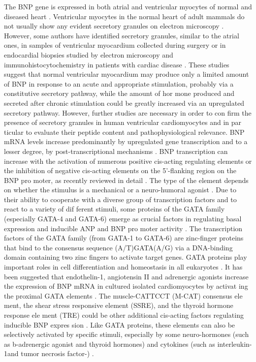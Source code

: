 \documentclass[14pt,a4paper,onecolumn]{extarticle}
\begin{document}
The BNP gene is expressed in both atrial and ventricular myocytes of normal and diseased heart \citep{12} \citep{13} \citep{14} \citep{18}. Ventricular myocytes in the normal heart of adult mammals do not usually show any evident secretory granules on electron microscopy \citep{13} \citep{14}.  However, some authors have identified secretory granules, similar to the atrial ones, in samples of ventricular myocardium collected during surgery or in endocardial biopsies studied by electron microscopy and immunohistocytochemistry in patients with cardiac disease \citep{14} \citep{25} \citep{26}. These studies suggest that normal ventricular myocardium may produce only a limited amount of BNP in response to an acute and appropriate stimulation, probably via a constitutive secretory pathway, while the amount of hor mone produced and secreted after chronic stimulation could be greatly increased via an upregulated secretory pathway. However, further studies are necessary in order to con firm the presence of secretory granules in human ventricular cardiomyocytes and in par ticular to evaluate their peptide content and pathophysiological relevance.  BNP mRNA levels increase predominantly by upregulated gene transcription and to a lesser degree, by post-transcriptional mechanisms \citep{22}. BNP transcription can increase with the activation of numerous positive cis-acting regulating elements or the inhibition of negative cis-acting elements on the 5’-flanking region on the BNP pro moter, as recently reviewed in detail \citep{18} \citep{22}. The type of the element depends on whether the stimulus is a mechanical or a neuro-humoral agonist \citep{22} \citep{23}. Due to their ability to cooperate with a diverse group of transcription factors and to react to a variety of dif ferent stimuli, some proteins of the GATA family (especially GATA-4 and GATA-6) emerge as crucial factors in regulating basal expression and inducible ANP and BNP pro moter activity \citep{18} \citep{23}. The transcription factors of the GATA family (from GATA-1 to GATA-6) are zinc-finger proteins that bind to the consensus sequence (A/T)GATA(A/G) via a DNA-binding domain containing two zinc fingers to activate target genes. GATA proteins play important roles in cell differentiation and homeostasis in all eukaryotes \citep{23}. It has been suggested that endothelin-1, angiotensin II and adrenergic agonists increase the expression of BNP mRNA in cultured isolated cardiomyocytes by activat ing the proximal GATA elements \citep{22}. The muscle-CATTCCT (M-CAT) consensus ele ment, the shear stress responsive element (SSRE), and the thyroid hormone response ele ment (TRE) could be other additional cis-acting factors regulating inducible BNP expres sion \citep{18} \citep{22}. Like GATA proteins, these elements can also be selectively activated by specific stimuli, especially by some neuro-hormones (such as b-adrenergic agonist and thyroid hormones) and cytokines (such as interleukin-1\beta [IL-1\beta] and tumor necrosis factor-) \citep{22}.
\end{document}
